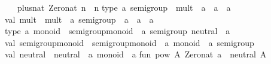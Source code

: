 \begin{isabellebody}
\begin{isamarkuptext}
\ \ {}\ plus{}nat\ Zero{}nat\ n\ {}\ n{}\isanewline
\isanewline
type\ {}a\ semigroup\ {}\ {}mult\ {}\ {}a\ {}{}\ {}a\ {}{}\ {}a{}{}\isanewline
val\ mult\ {}\ {}mult\ {}\ {}a\ semigroup\ {}{}\ {}a\ {}{}\ {}a\ {}{}\ {}a{}\isanewline
\isanewline
type\ {}a\ monoid\ {}\ {}semigroup{}monoid\ {}\ {}a\ semigroup{}\ neutral\ {}\ {}a{}{}\isanewline
val\ semigroup{}monoid\ {}\ {}semigroup{}monoid\ {}\ {}a\ monoid\ {}{}\ {}a\ semigroup{}\isanewline
val\ neutral\ {}\ {}neutral\ {}\ {}a\ monoid\ {}{}\ {}a{}\isanewline
\isanewline
fun\ pow\ A{}\ Zero{}nat\ a\ {}\ neutral\ A{}\isanewline

\end{isamarkuptext}
\end{isabellebody}
